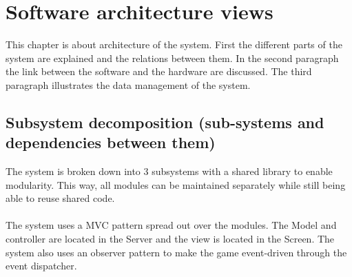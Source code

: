 \documentclass[11pt,a4paper]{article}
\begin{document}
\newpage

\section{Software architecture views}
This chapter is about architecture of the system. First the different parts of the system are explained and the relations between them. In the second paragraph the link between the software and the hardware are discussed. The third paragraph illustrates the data management of the system.

\subsection{Subsystem decomposition (sub-systems and dependencies between them)}
The system is broken down into 3 subsystems with a shared library to enable modularity. This way, all modules can be maintained separately while still being able to reuse shared code.\\
\\
The system uses a MVC pattern spread out over the modules. The Model and controller are located in the Server and the view is located in the Screen. The system also uses an observer pattern to make the game event-driven through the event dispatcher. 
\end{document}
